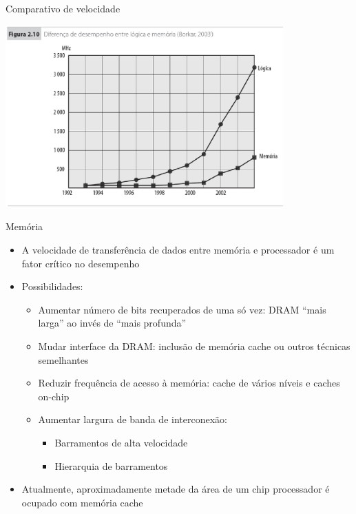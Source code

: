 \begin{slide}[toc=]{Comparativo de velocidade}
	\begin{center}
		\includegraphics[width=0.80\textwidth]{figs/diff_proc_mem.eps} 
	\end{center}
\end{slide}
\begin{slide}[toc=]{Memória}
	\begin{itemize}
		\item A velocidade de transferência de dados entre memória e processador é um fator crítico no desempenho\pause
		\item Possibilidades:
			\begin{itemize}
				\item Aumentar número de bits recuperados de uma só vez: DRAM ``mais larga'' ao invés de ``mais profunda''\pause
				\item Mudar interface da DRAM: inclusão de memória cache ou outros técnicas semelhantes \pause
				\item Reduzir frequência de acesso à memória: cache de vários níveis e caches on-chip\pause
				\item Aumentar largura de banda de interconexão:
					\begin{itemize}
						\item Barramentos de alta velocidade
						\item Hierarquia de barramentos\pause
					\end{itemize}
			\end{itemize}
		\item Atualmente, aproximadamente metade da área de um chip processador é ocupado com memória cache
	\end{itemize}
\end{slide}

